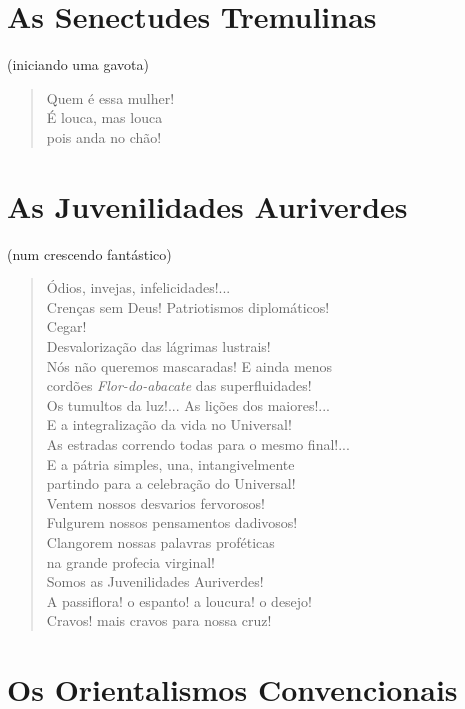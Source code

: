 \section*{As Senectudes Tremulinas}

\hfill{}(iniciando uma gavota)

\begin{verse}
Quem é essa mulher!\\
É louca, mas louca\\
pois anda no chão!
\end{verse}

\section{As Juvenilidades Auriverdes}

\hfill{}(num crescendo fantástico)

\begin{verse}
Ódios, invejas, infelicidades!...\\
Crenças sem Deus! Patriotismos diplomáticos!\\
Cegar!\\
Desvalorização das lágrimas lustrais!\\
Nós não queremos mascaradas! E ainda menos\\
cordões \emph{Flor-do-abacate} das superfluidades!\\
Os tumultos da luz!... As lições dos maiores!...\\
E a integralização da vida no Universal!\\
As estradas correndo todas para o mesmo final!...\\
E a pátria simples, una, intangivelmente\\
partindo para a celebração do Universal!\\
Ventem nossos desvarios fervorosos!\\
Fulgurem nossos pensamentos dadivosos!\\
Clangorem nossas palavras proféticas\\
na grande profecia virginal!\\
Somos as Juvenilidades Auriverdes!\\
A passiflora! o espanto! a loucura! o desejo!\\
Cravos! mais cravos para nossa cruz!
\end{verse}

\section{Os Orientalismos Convencionais}

